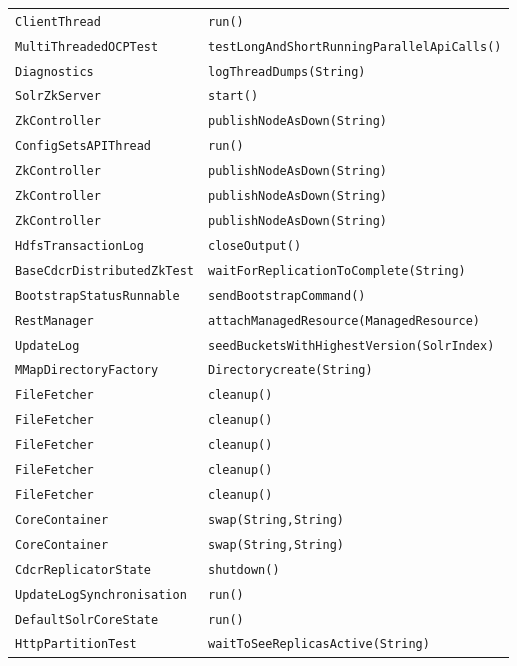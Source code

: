 \begin{center}
\begin{longtable}{ll}
\lstinline/ClientThread/&{\lstinline/run()/}\\
\lstinline/MultiThreadedOCPTest/&{\lstinline/testLongAndShortRunningParallelApiCalls()/}\\
\lstinline/Diagnostics/&{\lstinline/logThreadDumps(String)/}\\
\lstinline/SolrZkServer/&{\lstinline/start()/}\\
\lstinline/ZkController/&{\lstinline/publishNodeAsDown(String)/}\\
\lstinline/ConfigSetsAPIThread/&{\lstinline/run()/}\\
\lstinline/ZkController/&{\lstinline/publishNodeAsDown(String)/}\\
\lstinline/ZkController/&{\lstinline/publishNodeAsDown(String)/}\\
\lstinline/ZkController/&{\lstinline/publishNodeAsDown(String)/}\\
\lstinline/HdfsTransactionLog/&{\lstinline/closeOutput()/}\\
\lstinline/BaseCdcrDistributedZkTest/&{\lstinline/waitForReplicationToComplete(String)/}\\
\lstinline/BootstrapStatusRunnable/&{\lstinline/sendBootstrapCommand()/}\\
\lstinline/RestManager/&{\lstinline/attachManagedResource(ManagedResource)/}\\
\lstinline/UpdateLog/&{\lstinline/seedBucketsWithHighestVersion(SolrIndex)/}\\
\lstinline/MMapDirectoryFactory/&{\lstinline/Directorycreate(String)/}\\
\lstinline/FileFetcher/&{\lstinline/cleanup()/}\\
\lstinline/FileFetcher/&{\lstinline/cleanup()/}\\
\lstinline/FileFetcher/&{\lstinline/cleanup()/}\\
\lstinline/FileFetcher/&{\lstinline/cleanup()/}\\
\lstinline/FileFetcher/&{\lstinline/cleanup()/}\\
\lstinline/CoreContainer/&{\lstinline/swap(String,String)/}\\
\lstinline/CoreContainer/&{\lstinline/swap(String,String)/}\\
\lstinline/CdcrReplicatorState/&{\lstinline/shutdown()/}\\
\lstinline/UpdateLogSynchronisation/&{\lstinline/run()/}\\
\lstinline/DefaultSolrCoreState/&{\lstinline/run()/}\\
\lstinline/HttpPartitionTest/&{\lstinline/waitToSeeReplicasActive(String)/}\\

\end{longtable}
\end{center}
